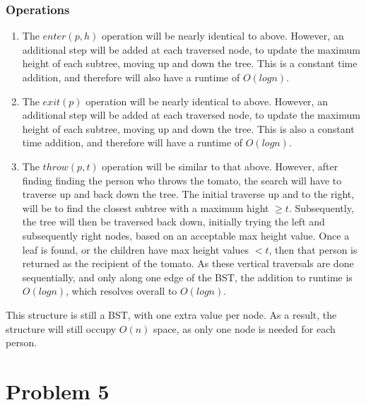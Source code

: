 \documentclass{article}
\begin{document}
\subsubsection{Operations}
\begin{enumerate}
    \item The $enter(p, h)$ operation will be nearly identical to above.
        However, an additional step will be added at each traversed node,
        to update the maximum height of each subtree, moving up and down the tree.
        This is a constant time addition, and therefore will also have a runtime of $O(log n)$.
    \item The $exit(p)$ operation will be nearly identical to above.
        However, an additional step will be added at each traversed node,
        to update the maximum height of each subtree, moving up and down the tree.
        This is also a constant time addition, and therefore will have a runtime of $O(log n)$.
    \item The $throw(p, t)$ operation will be similar to that above.
        However, after finding finding the person who throws the tomato,
        the search will have to traverse up and back down the tree.
        The initial traverse up and to the right, will be to find the closest subtree
        with a maximum hight $\geq t$.
        Subsequently, the tree will then be traversed back down, initially trying the left
        and subsequently right nodes, based on an acceptable max height value.
        Once a leaf is found, or the children have max height values $< t$, then that person
        is returned as the recipient of the tomato.
        As these vertical traversals are done sequentially, and only along one edge of the BST,
        the addition to runtime is $O(log n)$, which resolves overall to $O(log n)$.
\end{enumerate}

This structure is still a BST, with one extra value per node.
As a result, the structure will still occupy $O(n)$ space, as only one node is needed for each person.

\section{Problem 5}
\end{document}
